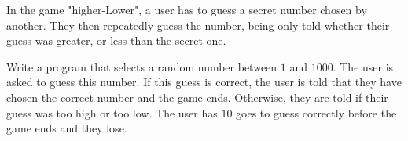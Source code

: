
In the game "higher-Lower", a user has to guess a secret number chosen by another.
They then repeatedly guess the number, being only told whether their guess was greater,
or less than the secret one.
\begin{exercise}
Write a program that selects a random number between $1$ and $1000$.
The user is asked to guess this number. If this guess is correct,
the user is told that they have chosen the correct number and the
game ends. Otherwise, they are told if their guess was too high or
too low. The user has $10$ goes to guess correctly before the game
ends and they lose.
\end{exercise}

